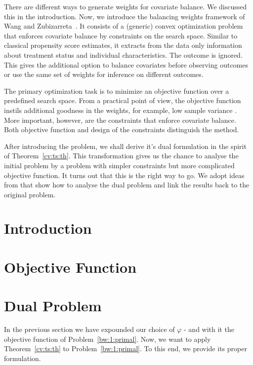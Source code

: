 There are different ways
to generate weights for covariate balance.
%
We discussed this in the introduction.
%
Now, we introduce the balancing weights framework of Wang and Zubizarreta~\cite{Wang2019}.
%
It consists of a (generic) convex optimization problem
that enforces covariate balance by constraints on the search space.
%
Similar to classical propensity score estimates, it
extracts from the data only information about treatment status and individual characteristics.
%
The outcome is ignored.
%
This gives the additional option to balance covariates before observing outcomes or use the same set of weights for inference on different outcomes.

%
The primary optimization task is to minimize an objective function
over a predefined search space.
%
From a practical point of view, the objective function
instils additional goodness in the weights, 
for example, 
low sample variance \cite[Introduction]{Zubizarreta2015}. 
%
%
More important, however, are the constraints that enforce covariate balance.
%
Both objective function and design of the constraints distinguish the method.
%

After introducing the problem, we shall derive it's dual formulation in the spirit of Theorem~\ref{cv:ts:th}.
This transformation gives us the chance to analyse the initial problem by a problem with simpler constraints but more complicated objective function.
It turns out that this is the right way to go.
We adopt ideas from \cite{Wang2019, Tseng1991} that show how to analyse the dual problem and link the results back to the original problem. 
\section{Introduction}


\section{Objective Function}

\section{Dual Problem}
In the previous section we have expounded our choice of $\varphi$ - and with it the objective function of Problem~\ref{bw:1:primal}.
%
Now, we want to apply Theorem~\ref{cv:ts:th} to Problem~\ref{bw:1:primal}.
%
To this end, we provide its proper formulation.
%


